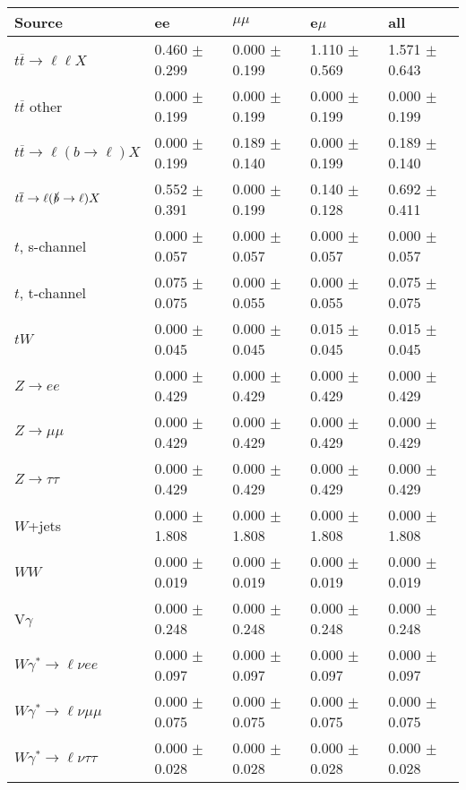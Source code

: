 \begin{tabular}{l | l l l l}
\hline\hline
 Source  &  ee  &  $\mu\mu$  &  e$\mu$  &  all \\
\hline
$t\overline{t}\rightarrow \ell\ell X$ &  0.460 $\pm$  0.299 &  0.000 $\pm$  0.199 &  1.110 $\pm$  0.569 &  1.571 $\pm$  0.643\\
$t\overline{t}$ other &  0.000 $\pm$  0.199 &  0.000 $\pm$  0.199 &  0.000 $\pm$  0.199 &  0.000 $\pm$  0.199\\
$t\overline{t}\rightarrow \ell(b\rightarrow \ell)X$ &  0.000 $\pm$  0.199 &  0.189 $\pm$  0.140 &  0.000 $\pm$  0.199 &  0.189 $\pm$  0.140\\
$t\overline{t}\rightarrow \ell(\slashed{b}\rightarrow \ell)X$ &  0.552 $\pm$  0.391 &  0.000 $\pm$  0.199 &  0.140 $\pm$  0.128 &  0.692 $\pm$  0.411\\
\hline
$t$, s-channel &  0.000 $\pm$  0.057 &  0.000 $\pm$  0.057 &  0.000 $\pm$  0.057 &  0.000 $\pm$  0.057\\
$t$, t-channel &  0.075 $\pm$  0.075 &  0.000 $\pm$  0.055 &  0.000 $\pm$  0.055 &  0.075 $\pm$  0.075\\
$tW$ &  0.000 $\pm$  0.045 &  0.000 $\pm$  0.045 &  0.015 $\pm$  0.045 &  0.015 $\pm$  0.045\\
\hline
$Z\rightarrow ee$ &  0.000 $\pm$  0.429 &  0.000 $\pm$  0.429 &  0.000 $\pm$  0.429 &  0.000 $\pm$  0.429\\
$Z\rightarrow\mu\mu$ &  0.000 $\pm$  0.429 &  0.000 $\pm$  0.429 &  0.000 $\pm$  0.429 &  0.000 $\pm$  0.429\\
$Z\rightarrow\tau\tau$ &  0.000 $\pm$  0.429 &  0.000 $\pm$  0.429 &  0.000 $\pm$  0.429 &  0.000 $\pm$  0.429\\
$W$+jets &  0.000 $\pm$  1.808 &  0.000 $\pm$  1.808 &  0.000 $\pm$  1.808 &  0.000 $\pm$  1.808\\
$WW$ &  0.000 $\pm$  0.019 &  0.000 $\pm$  0.019 &  0.000 $\pm$  0.019 &  0.000 $\pm$  0.019\\
\hline
V$\gamma$ &  0.000 $\pm$  0.248 &  0.000 $\pm$  0.248 &  0.000 $\pm$  0.248 &  0.000 $\pm$  0.248\\
$W\gamma^{*}\rightarrow\ell\nu e e$ &  0.000 $\pm$  0.097 &  0.000 $\pm$  0.097 &  0.000 $\pm$  0.097 &  0.000 $\pm$  0.097\\
$W\gamma^{*}\rightarrow\ell\nu\mu\mu$ &  0.000 $\pm$  0.075 &  0.000 $\pm$  0.075 &  0.000 $\pm$  0.075 &  0.000 $\pm$  0.075\\
$W\gamma^{*}\rightarrow\ell\nu\tau\tau$ &  0.000 $\pm$  0.028 &  0.000 $\pm$  0.028 &  0.000 $\pm$  0.028 &  0.000 $\pm$  0.028\\

\end{tabular}

